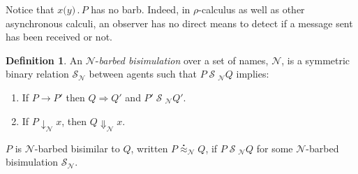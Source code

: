 \documentclass[]{amsart}
\newcommand{\lliftb}{\langle\!|}
\newcommand{\rliftb}{|\!\rangle}
\newcommand{\lpquote}{\ulcorner}
\newcommand{\rpquote}{\urcorner}
\newcommand{\id}[1]{\texttt{#1}}
\newcommand{\concat}{\mathbin{.}}
\newcommand{\nameeq}{\mathbin{\equiv_N}}
\newcommand{\prefix}[3]{#1 \id{(} #2 \id{)} \concat #3}
\newcommand{\lift}[2]{#1 \lliftb #2 \rliftb}
\newcommand{\quotep}[1]{\lpquote #1 \rpquote}
\newcommand{\red}{\rightarrow}
\newcommand{\wred}{\Rightarrow}
\newcommand{\parop}{\;|\;}		%
\newcommand{\rel}[1]{\;{\mathcal #1}\;} %
\newcommand{\wbbisim}{\stackrel{\centerdot}{\approx}} %
\newcommand{\fwbeq}{\stackrel{\circ}{\approx}}	%
\newcommand{\wbeq}{\approx}	%
\newtheorem{lem}[thm]{Lemma}
\theoremstyle{definition}
\newtheorem{defn}[thm]{Definition}
\theoremstyle{remark}
\newtheorem{rem}[thm]{Remark}
\numberwithin{equation}{subsection}
\newcommand{\rhoc}{$\rho$-calculus}
\begin{document}
Notice that $\prefix{x}{y}{P}$ has no barb.  Indeed, in {\rhoc} as well
as other asynchronous calculi, an observer has no direct means to
detect if a message sent has been received or not.

\begin{defn}
An  ${\mathcal N}$-\emph{barbed bisimulation} over a set of names, ${\mathcal N}$, is a symmetric binary relation 
${\mathcal S}_{\mathcal N}$ between agents such that $P\rel{S}_{\mathcal N}Q$ implies:
\begin{enumerate}
\item If $P \red P'$ then $Q \wred Q'$ and $P'\rel{S}_{\mathcal N} Q'$.
\item If $P\downarrow_{\mathcal N} x$, then $Q\Downarrow_{\mathcal N} x$.
\end{enumerate}
$P$ is ${\mathcal N}$-barbed bisimilar to $Q$, written
$P \wbbisim_{\mathcal N} Q$, if $P \rel{S}_{\mathcal N} Q$ for some ${\mathcal N}$-barbed bisimulation ${\mathcal S}_{\mathcal N}$.
\end{defn}





\end{document}
